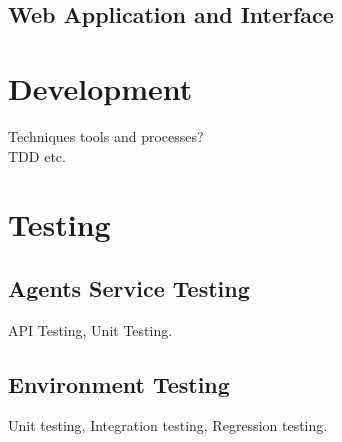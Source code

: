 \documentclass[]{final_report}
\begin{document}
\subsection{Web Application and Interface}

\section{Development}
Techniques tools and processes?\\
TDD etc.

\section{Testing}
\subsection{Agents Service Testing}
API Testing, Unit Testing.\\

\subsection{Environment Testing}
Unit testing, Integration testing, Regression testing.\\
\end{document}

